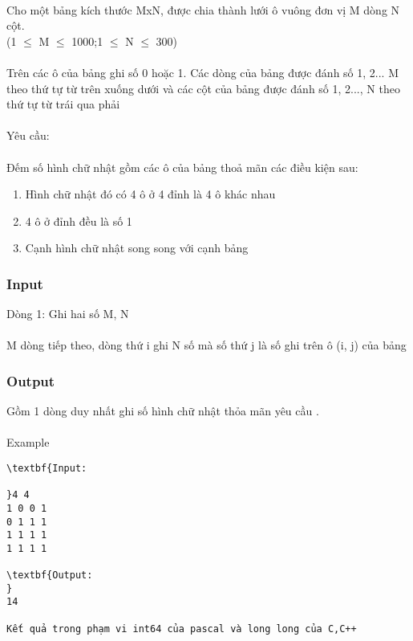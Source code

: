 

 

Cho một bảng kích thước MxN, được chia thành lưới ô vuông đơn vị M dòng N cột.
\\(1 $\le$ M $\le$ 1000;1 $\le$ N $\le$ 300)
\\
\\Trên các ô của bảng ghi số 0 hoặc 1. Các dòng của bảng được đánh số 1, 2... M theo thứ tự từ trên xuống dưới và các cột của bảng được đánh số 1, 2..., N theo thứ tự từ trái qua phải
\\
\\Yêu cầu:
\\
\\Đếm số hình chữ nhật gồm các ô của bảng thoả mãn các điều kiện sau:
\begin{enumerate}
	\item Hình chữ nhật đó có 4 ô ở 4 đỉnh là 4 ô khác nhau
	\item 4 ô ở đỉnh đều là số 1
	\item Cạnh hình chữ nhật song song với cạnh bảng
\end{enumerate}

\subsubsection{Input}

Dòng 1: Ghi hai số M, N
\\
\\M dòng tiếp theo, dòng thứ i ghi N số mà số thứ j là số ghi trên ô (i, j) của bảng

\subsubsection{Output}

Gồm 1 dòng duy nhất ghi số hình chữ nhật thỏa mãn yêu cầu .
\\
\\Example
\begin{verbatim}
\textbf{Input:

}4 4
1 0 0 1
0 1 1 1
1 1 1 1
1 1 1 1

\textbf{Output:
}
14

Kết quả trong phạm vi int64 của pascal và long long của C,C++


\end{verbatim}
